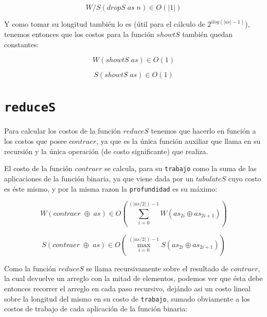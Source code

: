 \documentclass[a4paper,10pt]{article}
\begin{document}
\begin{equation*}
    W/S \left( dropS\; as\; n \right) \in 
    O \left( \vert 1 \vert \right)
\end{equation*}

\bigskip
   
    Y como tomar su longitud también lo es (útil para el cálculo de 
$2^{ilog(\vert as \vert -1)}$), tenemos entonces que los costos para la función
$showtS$ también quedan constantes:

\begin{equation*}
    W \left( showtS\; as \right) \in O \left( 1 \right)
\end{equation*}

\begin{equation*}
    S \left( showtS\; as \right) \in O \left( 1 \right)
\end{equation*}


\bigskip
    

\section*{\texttt{reduceS}}

    Para calcular los costos de la función $reduceS$ tenemos que hacerlo en función
a los costos que posee $contraer$, ya que es la única función auxiliar que llama en
su recursión y la única operación (de costo significante) que realiza.

    El costo de la función $contraer$ se calcula, para su \texttt{trabajo} como
la suma de las aplicaciones de la función binaria, ya que viene dada por un $tabulateS$
cuyo costo es éste mismo, y por la misma razon la \texttt{profundidad} es su
máximo:

\begin{equation*}
    W \left( contraer \;\oplus \;as \right) \in
    O \left( \sum_{i=0}^{(\vert as / 2 \vert) - 1} W \left( as_{2i} \oplus as_{2i+1} \right) \right)
\end{equation*}

\begin{equation*}
    S \left( contraer \;\oplus \;as \right) \in
    O \left( \max_{i=0}^{(\vert as / 2 \vert) - 1} S \left( as_{2i} \oplus as_{2i+1} \right) \right)
\end{equation*}

\bigskip

    Como la función $reduceS$ se llama recursivamente sobre el resultado de $contraer$,
la cual devuelve un arreglo con la mitad de elementos, podemos ver que ésta debe
entonces recorrer el arreglo en cada paso recursivo, dejándo asi un costo lineal sobre
la longitud del mismo en su costo de \texttt{trabajo}, sumado obviamente a los costos
de trabajo de cada aplicación de la función binaria:
\end{document}
